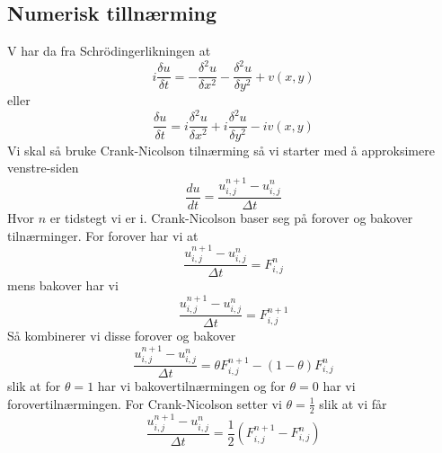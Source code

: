 \documentclass[reprint,english,notitlepage]{revtex4-2}  %
\begin{document}
\subsection{Numerisk tillnærming} 
V har da fra Schrödingerlikningen at
$$
i\frac{\delta u}{\delta t}=-\frac{\delta^2 u}{\delta x^2}-\frac{\delta^2 u}{\delta y^2}+v(x,y)
$$
eller 
$$
\frac{\delta u}{\delta t}=i\frac{\delta^2 u}{\delta x^2}+i\frac{\delta^2 u}{\delta y^2}-iv(x,y)
$$
Vi skal så bruke Crank-Nicolson tilnærming så vi starter med å approksimere venstre-siden
$$
\frac{d u}{dt}=\frac{u^{n+1}_{i,j}-u^{n}_{i,j}}{\Delta t}
$$
Hvor $n$ er tidstegt vi er i.
Crank-Nicolson baser seg på forover og bakover tilnærminger. For forover har vi at
$$
\frac{u^{n+1}_{i,j}-u^{n}_{i,j}}{\Delta t}=F^{n}_{i,j}
$$ 
mens bakover har vi
$$
\frac{u^{n+1}_{i,j}-u^{n}_{i,j}}{\Delta t}=F^{n+1}_{i,j}
$$
Så kombinerer vi disse forover og bakover
$$
\frac{u^{n+1}_{i,j}-u^n_{i,j}}{\Delta t}=\theta F^{n+1}_{i,j}-(1-\theta)F^{n}_{i,j}
$$
slik at for $\theta=1$ har vi bakovertilnærmingen og for $\theta=0$ har vi forovertilnærmingen.
For Crank-Nicolson setter vi $\theta =\frac{1}{2}$ slik at vi får
$$
\frac{u^{n+1}_{i,j}-u^n_{i,j}}{\Delta t}=\frac{1}{2}(F^{n+1}_{i,j}-F^{n}_{i,j})
$$
\end{document}
